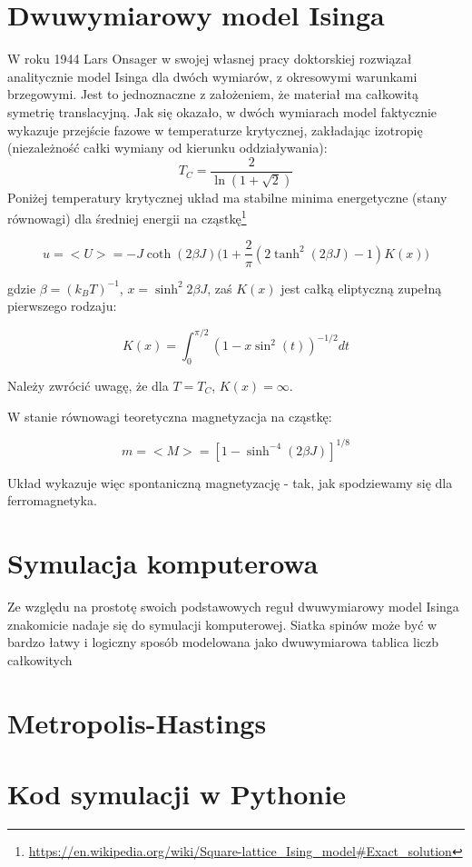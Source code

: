 \documentclass[11pt]{article}
\begin{document}
\section{Dwuwymiarowy model Isinga}
W roku 1944 Lars Onsager w swojej własnej pracy doktorskiej rozwiązał analitycznie
model Isinga dla dwóch wymiarów, z okresowymi warunkami brzegowymi. Jest to jednoznaczne z założeniem,
że materiał ma całkowitą symetrię translacyjną. Jak się okazało, w dwóch wymiarach model faktycznie
wykazuje przejście fazowe w temperaturze krytycznej, zakładając izotropię
(niezależność całki wymiany od kierunku oddziaływania):
\[ T_C = \frac{2}{\ln{(1+\sqrt{2})}} \]
Poniżej temperatury krytycznej układ ma stabilne minima energetyczne (stany równowagi) dla średniej
energii na cząstkę\footnote{\url{https://en.wikipedia.org/wiki/Square-lattice_Ising_model#Exact_solution}}

\[ u = <U> = -J \coth{(2\beta J)} \Big(1+\frac{2}{\pi}(2\tanh^2{(2\beta J)} -1) K(x) \Big) \]

gdzie $\beta=(k_B T)^{-1}$, $x=\sinh^2{2 \beta J}$, zaś $K(x)$ jest całką eliptyczną zupełną pierwszego rodzaju:

\[ K(x) = \int_0^{\pi/2} (1-x \sin^2(t))^{-1/2} dt\]

Należy zwrócić uwagę, że dla $T=T_C$, $K(x)=\infty$.

W stanie równowagi teoretyczna magnetyzacja na cząstkę:

\[m = <M> = [1-\sinh^{-4}{(2\beta J)}]^{1/8} \]

Układ wykazuje więc spontaniczną magnetyzację - tak, jak spodziewamy się dla
ferromagnetyka.

\section{Symulacja komputerowa}
Ze względu na prostotę swoich podstawowych reguł dwuwymiarowy model Isinga znakomicie
nadaje się do symulacji komputerowej. Siatka spinów może być w bardzo łatwy i logiczny sposób
modelowana jako dwuwymiarowa tablica liczb całkowitych
\section{Metropolis-Hastings}

\section{Kod symulacji w Pythonie}

\end{document}
